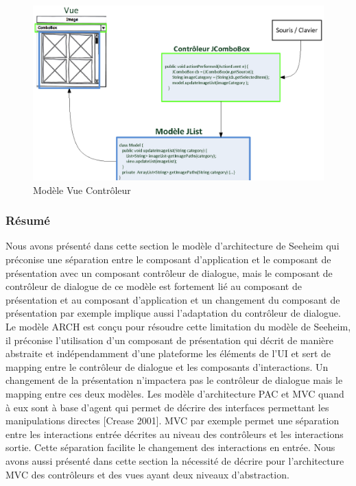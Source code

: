 \begin{figure}[ht]
\begin{center}
\includegraphics[width=432pt]{chap2/img-2.eps}
\caption{Modèle Vue Contrôleur}\label{fig:6}
\end{center}
\end{figure}
\subsubsection{Résumé}
Nous avons présenté dans cette section le modèle d'architecture de Seeheim qui préconise une séparation entre le composant d'application et le composant de présentation avec un composant contrôleur de dialogue, mais le composant de contrôleur de dialogue de ce modèle est fortement lié au composant de présentation et au composant d'application et un changement du composant de présentation par exemple implique aussi l'adaptation du contrôleur de dialogue. Le modèle ARCH est conçu pour résoudre cette limitation du modèle de Seeheim, il préconise l'utilisation d'un composant de présentation qui décrit de manière abstraite et indépendamment d'une plateforme les éléments de l'UI et sert de mapping entre le contrôleur de dialogue et les composants d'interactions. Un changement de la présentation n'impactera pas le contrôleur de dialogue mais le mapping entre ces deux modèles. Les modèle d'architecture PAC et MVC quand à eux sont à base d'agent qui permet de décrire des interfaces permettant les manipulations directes [Crease 2001]. MVC par exemple permet une séparation entre les interactions entrée décrites au niveau des contrôleurs et les interactions sortie. Cette séparation facilite le changement des interactions en entrée. Nous avons aussi présenté dans cette section la nécessité de décrire pour l'architecture MVC des contrôleurs et des vues ayant deux niveaux d'abstraction.
